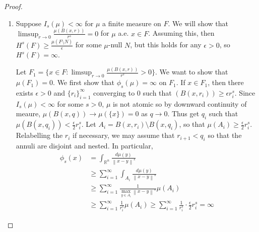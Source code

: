 \documentclass[11pt, a4paper]{memoir}
\DeclareMathOperator{\R}{{\mathbb{R}}}
\newcommand{\norm}[1]{\ensuremath{\left\lVert#1\right\rVert}}
\theoremstyle{change}
\theoremstyle{plain}
\theoremstyle{nonumberplain}
\newtheorem{proof}{Proof}
\numberwithin{equation}{section}
\begin{document}
\begin{proof}
    \begin{enumerate}[nl,r]
        \item Suppose $I_s(\mu)<\infty$ for $\mu$ a finite measure on $F$.
            We will show that $\limsup_{r\to 0}\frac{\mu(B(x,r))}{r^s}=0$ for $\mu$ a.e. $x\in F$.
            Assuming this, then $H^s(F)\geq\frac{\mu(F\setminus N)}{\epsilon}$ for some $\mu$-null $N$, but this holds for any $\epsilon>0$, so $H^s(F)=\infty$.

            Let $F_1=\{x\in F:\limsup_{r\to 0}\frac{\mu(B(x,r))}{r^s}>0\}$.
            We want to show that $\mu(F_1)=0$.
            We first show that $\phi_s(\mu)=\infty$ on $F_1$.
            If $x\in F_1$, then there exists $\epsilon>0$ and $\{r_i\}_{i=1}^\infty$ converging to $0$ such that $(B(x,r_i))\geq\epsilon r_i^s$.
            Since $I_s(\mu)<\infty$ for some $s>0$, $\mu$ is not atomic so by downward continuity of meaure, $\mu(B(x,q))\to \mu(\{x\})=0$ as $q\to 0$.
            Thus get $q_i$ such that $\mu(B(x,q_i))<\frac{\epsilon}{2}r_i^s$.
            Let $A_i=B(x,r_i)\setminus B(x,q_i)$, so that $\mu(A_i)\geq\frac{\epsilon}{2}r_i^s$.
            Relabelling the $r_i$ if necessary, we may assume that $r_{i+1}<q_i$ so that the annuli are disjoint and nested.
            In particular,
            \begin{align*}
                \phi_s(x) &= \int_{\R^n}\frac{d\mu(y)}{\norm{x-y}^s}\\
                          &\geq\sum_{i=1}^\infty\int_{A_i}\frac{d\mu(y)}{\norm{x-y}^s}\\
                          &\geq\sum_{i=1}^\infty\frac{1}{\max_{y\in A_i}\norm{x-y}^s}\mu(A_i)\\
                          &\geq\sum_{i=1}^\infty\frac{1}{r_i^s}\mu(A_i)\geq\sum_{i=1}^\infty\frac{1}{r_i^s}\cdot\frac{\epsilon}{2}r_i^s=\infty
            \end{align*}


\end{enumerate}
\end{proof}
\end{document}

